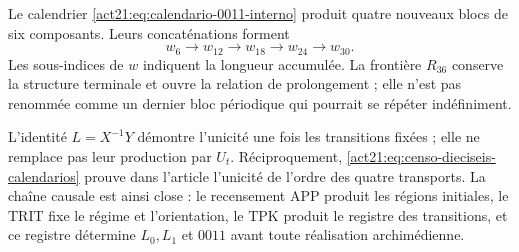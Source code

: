 Le calendrier \eqref{act21:eq:calendario-0011-interno} produit quatre nouveaux
blocs de six composants. Leurs concaténations forment
\[
 w_6\longrightarrow w_{12}\longrightarrow w_{18}
 \longrightarrow w_{24}\longrightarrow w_{30}.
\]
Les sous-indices de \(w\) indiquent la longueur accumulée. La frontière \(R_{36}\) conserve la structure terminale et ouvre la relation de prolongement ; elle n'est pas renommée comme un dernier bloc périodique qui pourrait se répéter indéfiniment.

L'identité \(L=X^{-1}Y\) démontre l'unicité une fois les
transitions fixées ; elle ne remplace pas leur production par \(U_t\). Réciproquement,
\eqref{act21:eq:censo-dieciseis-calendarios} prouve dans l'article l'unicité
de l'ordre des quatre transports. La chaîne causale est ainsi close :
le recensement APP produit les régions initiales, le TRIT fixe le régime et
l'orientation, le TPK produit le registre des transitions, et ce registre
détermine \(L_0,L_1\) et \(0011\) avant toute réalisation archimédienne.
